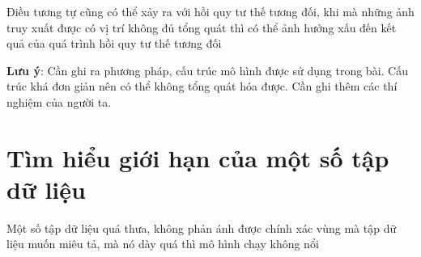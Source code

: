 Điều tương tự cũng có thể xảy ra với hồi quy tư thế tương đối, khi mà những ảnh truy xuất được có vị trí không đủ tổng quát thì có thể ảnh hưởng xấu đến kết quả của quá trình hồi quy tư thế tương đối

\textbf{Lưu ý}: Cần ghi ra phương pháp, cấu trúc mô hình được sử dụng trong bài. Cấu trúc khá đơn giản nên có thể không tổng quát hóa được. Cần ghi thêm các thí nghiệm của người ta.

\section{Tìm hiểu giới hạn của một số tập dữ liệu}
Một số tập dữ liệu quá thưa, không phản ánh được chính xác vùng mà tập dữ liệu muốn miêu tả, mà nó dày quá thì mô hình chạy không nổi\cite{berton2022rethinking}
